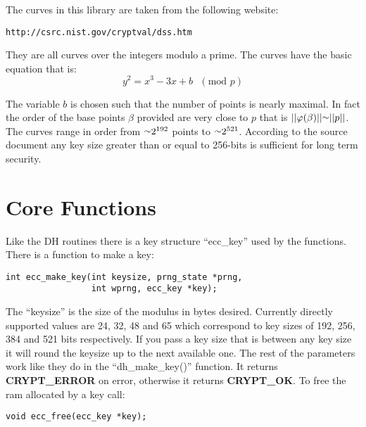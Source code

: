 \documentclass{book}
\def\approx{\raisebox{0.2ex}{\mbox{\small $\sim$}}}
\def\phi{\varphi}
\begin{document}
The curves in this library are taken from the following website:
\begin{verbatim}
http://csrc.nist.gov/cryptval/dss.htm
\end{verbatim}

They are all curves over the integers modulo a prime.  The curves have the basic equation that is:
\begin{equation}
y^2 = x^3 - 3x + b\mbox{ }(\mbox{mod }p)
\end{equation}

The variable $b$ is chosen such that the number of points is nearly maximal.  In fact the order of the base points $\beta$ 
provided are very close to $p$ that is $\vert \vert \phi(\beta) \vert \vert \approx \vert \vert p \vert \vert$.  The curves
range in order from $\approx 2^{192}$ points to $\approx 2^{521}$.  According to the source document any key size greater
than or equal to 256-bits is sufficient for long term security.  

\section{Core Functions}

Like the DH routines there is a key structure ``ecc\_key'' used by the functions.  There is a function to make a key:
\begin{verbatim}
int ecc_make_key(int keysize, prng_state *prng, 
                 int wprng, ecc_key *key);
\end{verbatim}

The ``keysize'' is the size of the modulus in bytes desired.  Currently directly supported values are 24, 32, 48 and 65 which
correspond to key sizes of 192, 256, 384 and 521 bits respectively.  If you pass a key size that is between any key size
it will round the keysize up to the next available one.  The rest of the parameters work like they do in the ``dh\_make\_key()'' function.  It returns
{\bf CRYPT\_ERROR} on error, otherwise it returns {\bf CRYPT\_OK}.  To free the ram allocated by a key call:
\begin{verbatim}
void ecc_free(ecc_key *key);
\end{verbatim}
\end{document}
